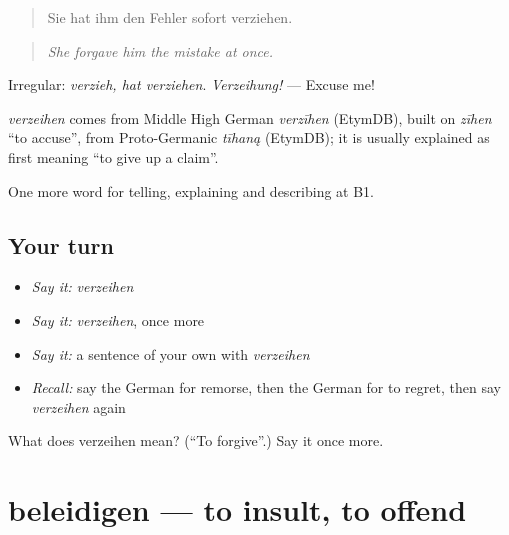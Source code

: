 \begin{quote}
Sie hat ihm den Fehler sofort verziehen.
\end{quote}

\begin{quote}
\emph{She forgave him the mistake at once.}
\end{quote}

Irregular: \emph{verzieh, hat verziehen}. \emph{Verzeihung!} — Excuse me!

\begin{cousinweb}
\emph{verzeihen} comes from Middle High German \emph{verzīhen} (EtymDB), built on \emph{zīhen} \textquotedblleft{}to accuse\textquotedblright{}, from Proto-Germanic \emph{tīhaną} (EtymDB); it is usually explained as first meaning \textquotedblleft{}to give up a claim\textquotedblright{}.
\end{cousinweb}

\begin{grammarlens}[title={What you've built}]
One more word for telling, explaining and describing at B1.
\end{grammarlens}

\subsection*{Your turn}
\begin{itemize}
\raggedright
  \item \emph{Say it:} \emph{verzeihen}
  \item \emph{Say it:} \emph{verzeihen}, once more
  \item \emph{Say it:} a sentence of your own with \emph{verzeihen}
  \item \emph{Recall:} say the German for remorse, then the German for to regret, then say \emph{verzeihen} again
\end{itemize}

\begin{tcolorbox}[breakable,colback=teal!4,colframe=teal!35!black,title={Before you move on}]
What does verzeihen mean? (\textquotedblleft{}To forgive\textquotedblright{}.) Say it once more.
\end{tcolorbox}
\section[beleidigen]{beleidigen — to insult, to offend}

\label{lesson:GE-C478-beleidigen}



